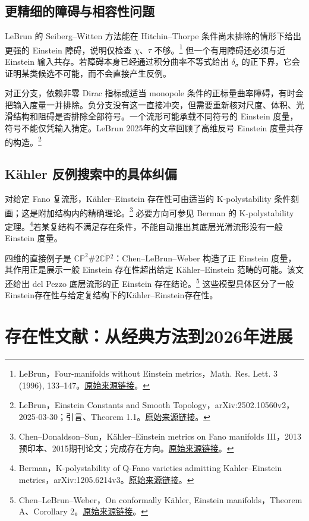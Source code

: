 \documentclass[11pt,a4paper]{article}
\theoremstyle{definition}
\newcommand{\src}[3]{\footnote{\raggedright #1，#2。\href{#3}{原始来源链接}。}}
\begin{document}
\subsection{更精细的障碍与相容性问题}

LeBrun 的 Seiberg--Witten 方法能在 Hitchin--Thorpe 条件尚未排除的情形下给出更强的 Einstein 障碍，说明仅检查 $\chi$、$\tau$ 不够。\src{LeBrun}{Four-manifolds without Einstein metrics，Math. Res. Lett. 3 (1996), 133--147}{https://arxiv.org/abs/dg-ga/9511015}
但一个有用障碍还必须与近 Einstein 输入共存。若障碍本身已经通过积分曲率不等式给出 $\delta_\sigma$ 的正下界，它会证明某类候选不可能，而不会直接产生反例。

对正分支，依赖非零 Dirac 指标或适当 monopole 条件的正标量曲率障碍，有时会把输入度量一并排除。负分支没有这一直接冲突，但需要重新核对尺度、体积、光滑结构和阻碍是否排除全部符号。一个流形可能承载不同符号的 Einstein 度量，符号不能仅凭输入猜定。LeBrun 2025年的文章回顾了高维反号 Einstein 度量共存的构造。\src{LeBrun}{Einstein Constants and Smooth Topology，arXiv:2502.10560v2，2025-03-30；引言、Theorem 1.1}{https://arxiv.org/abs/2502.10560v2}

\subsection{Kähler 反例搜索中的具体纠偏}

对给定 Fano 复流形，Kähler--Einstein 存在性可由适当的 K-polystability 条件刻画；这是附加结构内的精确理论。\src{Chen--Donaldson--Sun}{Kähler--Einstein metrics on Fano manifolds III，2013预印本、2015期刊论文；完成存在方向}{https://arxiv.org/abs/1302.0282}
必要方向可参见 Berman 的 K-polystability 定理。\src{Berman}{K-polystability of Q-Fano varieties admitting Kahler--Einstein metrics，arXiv:1205.6214v3}{https://arxiv.org/abs/1205.6214v3}若某复结构不满足存在条件，不能自动推出其底层光滑流形没有一般 Einstein 度量。

四维的直接例子是 $\mathbb{CP}^2\#2\overline{\mathbb{CP}}{}^2$：Chen--LeBrun--Weber 构造了正 Einstein 度量，其作用正是展示一般 Einstein 存在性超出给定 Kähler--Einstein 范畴的可能。该文还给出 del Pezzo 底层流形的正 Einstein 存在结论。\src{Chen--LeBrun--Weber}{On conformally Kähler, Einstein manifolds，Theorem A、Corollary 2}{https://arxiv.org/abs/0705.0710}
这些模型具体区分了一般Einstein存在性与给定复结构下的Kähler--Einstein存在性。

\section{存在性文献：从经典方法到2026年进展}\label{sec:existence}
\end{document}
